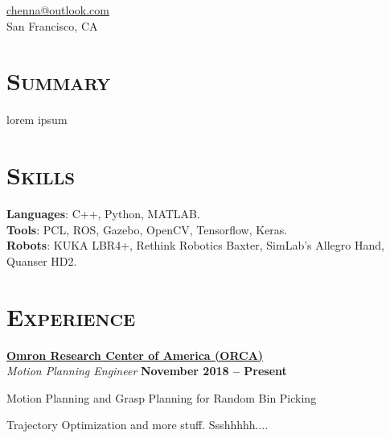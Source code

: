 \documentclass[margin, line]{resume}
\begin{document}
\author{Kautilya Chenna}
{
	\sc
	\hfill \href{mailto:chenna@outlook.com}{chenna@outlook.com}		\vspace{0mm}\\\vspace{0mm}%
	\hfill San Francisco, CA										\vspace{0mm}\\\vspace{-10.5mm}%
}

\begin{resume}

	\section{\mysidestyle \textsc{Summary}}
	lorem ipsum 


    
    \sectionline
	\section{\mysidestyle \textsc{Skills}} 
	
	\textbf{Languages}: C++, Python, MATLAB. \\[1mm]
	\textbf{Tools}: PCL, ROS, Gazebo, OpenCV, Tensorflow, Keras. \\[1mm]
	\textbf{Robots}: KUKA LBR4+, Rethink Robotics Baxter, SimLab's Allegro Hand, Quanser HD2.%


	
	\sectionline
	\section{\mysidestyle \textsc{Experience}}
	
	\href{https://www.omron.com/global/americas/usa.html}{\textbf{Omron Research Center of America (ORCA)}} \vspace{1pt}\\\vspace{1pt}%
	\textsl{Motion Planning Engineer} \hfill \textbf{November 2018 -- Present}\\ \vspace{-4.5mm}
	\begin{list2}
		\item Motion Planning and Grasp Planning for Random Bin Picking
		\item Trajectory Optimization and more stuff. Ssshhhhh....
	\end{list2}\vspace{-2.25mm}
	

\end{resume}
\end{document}

